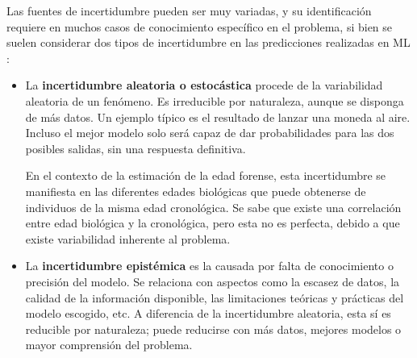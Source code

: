 Las fuentes de incertidumbre pueden ser muy variadas, y su identificación requiere en muchos casos de 
conocimiento específico en el problema, si bien se suelen considerar dos tipos de incertidumbre en las 
predicciones realizadas en ML \cite{hullermeier2021, nemani2023}:

\begin{itemize}
    
    \item La \textbf{incertidumbre aleatoria o estocástica} procede de la variabilidad aleatoria de un 
    fenómeno. 
    Es irreducible por naturaleza, aunque se disponga de más datos. 
    Un ejemplo típico es el resultado de lanzar una moneda al aire. Incluso el mejor modelo solo será capaz de 
    dar probabilidades para las dos posibles salidas, sin una respuesta definitiva. 
    

    En el contexto de la estimación de la edad forense, esta incertidumbre se manifiesta en las diferentes 
    edades biológicas que puede obtenerse de individuos de la misma edad cronológica.
    Se sabe que existe una correlación entre edad biológica y la cronológica, pero esta no es perfecta, 
    debido a que existe variabilidad inherente al problema.

        
        
    


    \item La \textbf{incertidumbre epistémica} es la causada por falta de conocimiento o precisión del modelo.
    Se relaciona con aspectos como la escasez de datos, la calidad de la información disponible, las 
    limitaciones teóricas y prácticas del modelo escogido, etc. 
    A diferencia de la incertidumbre aleatoria, esta sí es reducible por naturaleza; puede reducirse con más
    datos, mejores modelos o mayor comprensión del problema. 
    
\end{itemize}

